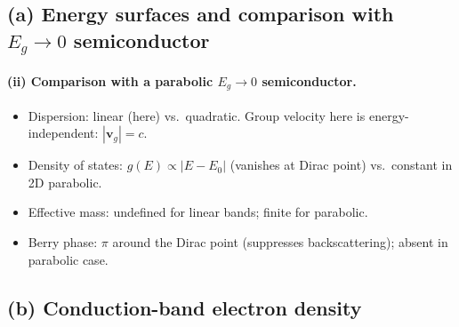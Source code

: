 \documentclass[11pt]{article}
\renewcommand{\vb}[1]{\mathbf{#1}}
\begin{document}
\subsection*{(a) Energy surfaces and comparison with $E_g\to 0$ semiconductor}

\begin{center}
\end{center}

\paragraph{(ii) Comparison with a parabolic $E_g\to 0$ semiconductor.}
\begin{itemize}
\item Dispersion: linear (here) vs.\ quadratic. Group velocity here is energy-independent: $|\vb v_g|=c$.
\item Density of states: $g(E)\propto|E-E_0|$ (vanishes at Dirac point) vs.\ constant in 2D parabolic.
\item Effective mass: undefined for linear bands; finite for parabolic.
\item Berry phase: $\pi$ around the Dirac point (suppresses backscattering); absent in parabolic case.
\end{itemize}

\subsection*{(b) Conduction-band electron density}
\end{document}
